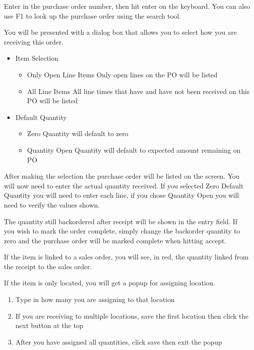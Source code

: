 Enter in the purchase order number, then hit enter on the keyboard. You can also use F1 to look up the purchase order using the search tool.

You will be presented with a dialog box that allows you to select how you are receiving this order.

\begin{itemize}
	\item Item Selection
	\begin{itemize}
		\item Only Open Line Items \textemdash Only open lines on the PO will be listed
		\item All Line Items \textemdash All line times that have and have not been received on this PO will be listed
	\end{itemize}
	\item Default Quantity
	\begin{itemize}
		\item Zero \textemdash Quantity will default to zero
		\item Quantity Open \textemdash Quantity will default to expected amount remaining on PO
	\end{itemize}
\end{itemize}

After making the selection the purchase order will be listed on the screen. You will now need to enter the actual quantity received. If you selected Zero Default Quantity you will need to enter each line, if you chose Quantity Open you will need to verify the values shown.

The quantity still backordered after receipt will be shown in the entry field. If you wish to mark the order complete, simply change the backorder quantity to zero and the purchase order will be marked complete when hitting accept.

If the item is linked to a sales order, you will see, in red, the quantity linked from the receipt to the sales order.

If the item is only located, you will get a popup for assigning location.

\begin{enumerate}
	\item Type in how many you are assigning to that location
	\item If you are receiving to multiple locations, save the first location then click the next button at the top
	\item After you have assigned all quantities, click save then exit the popup	
\end{enumerate}

